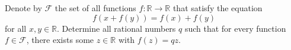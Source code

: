 Denote by $\mathcal{F}$ the set of all functions $f\colon \mathbb{R}\rightarrow \mathbb{R}$ that
satisfy the equation
$$f(x+f(y)) = f(x)+f(y)$$
for all $x,y\in\mathbb{R}$.
Determine all rational numbers $q$ such that for every function $f\in\mathcal{F}$,
there exists some $z\in\mathbb{R}$ with $f(z) = qz$.
